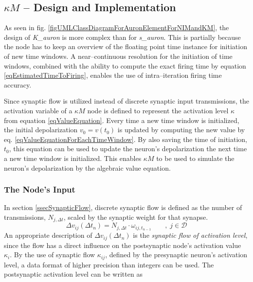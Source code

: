 	\subsection{$\kappa M$ -- Design and Implementation}
		As seen in fig. \ref{figUMLClassDiagramForAuronElementForNIMandKM}, the design of \emph{K\_auron} is more complex than for \emph{s\_auron}.
		This is partially because the node has to keep an overview of the floating point time instance for initiation of new time windows.
		A near--continuous resolution for the initiation of time windows, combined with the ability to compute the exact firing time by equation \ref{eqEstimatedTimeToFiring},
			enables the use of intra--iteration firing time accuracy.
		
		Since synaptic flow is utilized instead of discrete synaptic input transmissions, the activation variable of a $\kappa M$ node is defined 
			to represent the activation level $\kappa$ from equation \ref{eqValueEquation}.
		Every time a new time window is initialized, the initial depolarization $v_0 = v(t_0)$ is updated by computing the new value by eq. \ref{eqValueEquationForEachTimeWindow}.
		By also saving the time of initiation, $t_0$, this equation can be used to update the neuron's depolarization the next time a new time window is initialized. %
		This enables $\kappa M$ to be used to simulate the neuron's depolarization by the algebraic value equation.


		\subsubsection{The Node's Input}	
		In section \ref{ssecSynapticFlow}, discrete synaptic flow is defined as the number of transmissions, $N_{j, \Delta t}$,  scaled by the synaptic weight for that synapse.
\begin{equation}
		\Delta v_{ij}(\Delta t_n) = N_{j, \Delta t} \cdot \omega_{ij, t_{n-1}} \qquad,\;j\in\mathcal{D}
		\nonumber
\end{equation}
		An appropriate description of $\Delta v_{ij}(\Delta t_n)$  is the \emph{synaptic flow of activation level}, since the flow has a direct influence on the postsynaptic node's activation value $\kappa_i$.
		By the use of synaptic flow $\kappa_{ij}$, defined by the presynaptic neuron's activation level, a data format of higher precision than integers can be used.
		The postsynaptic activation level can be written as

